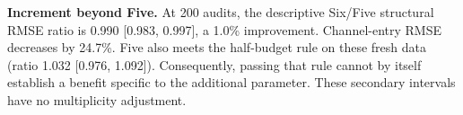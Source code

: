\textbf{Increment beyond Five.} At 200 audits, the descriptive Six/Five structural RMSE ratio is 0.990 [0.983, 0.997], a 1.0\% improvement. Channel-entry RMSE decreases by 24.7\%. Five also meets the half-budget rule on these fresh data (ratio 1.032 [0.976, 1.092]). Consequently, passing that rule cannot by itself establish a benefit specific to the additional parameter. These secondary intervals have no multiplicity adjustment.
